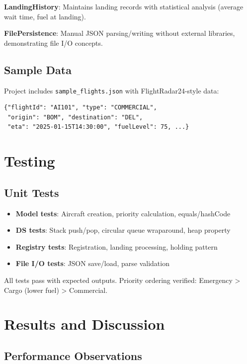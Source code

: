 \documentclass[12pt,a4paper]{article}
\begin{document}
\textbf{LandingHistory}: Maintains landing records with statistical analysis (average wait time, fuel at landing).

\textbf{FilePersistence}: Manual JSON parsing/writing without external libraries, demonstrating file I/O concepts.

\subsection{Sample Data}

Project includes \texttt{sample\_flights.json} with FlightRadar24-style data:
\begin{lstlisting}
{"flightId": "AI101", "type": "COMMERCIAL", 
 "origin": "BOM", "destination": "DEL", 
 "eta": "2025-01-15T14:30:00", "fuelLevel": 75, ...}
\end{lstlisting}

\section{Testing}

\subsection{Unit Tests}

\begin{itemize}
    \item \textbf{Model tests}: Aircraft creation, priority calculation, equals/hashCode
    \item \textbf{DS tests}: Stack push/pop, circular queue wraparound, heap property
    \item \textbf{Registry tests}: Registration, landing processing, holding pattern
    \item \textbf{File I/O tests}: JSON save/load, parse validation
\end{itemize}

All tests pass with expected outputs. Priority ordering verified: Emergency > Cargo (lower fuel) > Commercial.

\section{Results and Discussion}

\subsection{Performance Observations}
\end{document}
